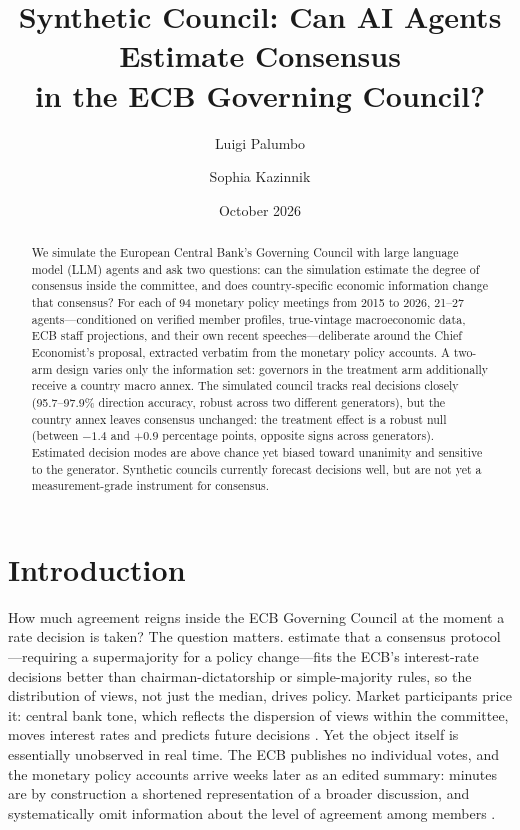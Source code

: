 \documentclass[11pt,a4paper]{article}
\title{\textbf{Synthetic Council: Can AI Agents Estimate Consensus\\ in the ECB Governing Council?}}
\author{Luigi Palumbo \and Sophia Kazinnik}
\date{October 2026}
\begin{document}
\maketitle

\begin{abstract}
\noindent
We simulate the European Central Bank's Governing Council with large language model (LLM) agents and ask two questions: can the simulation estimate the degree of consensus inside the committee, and does country-specific economic information change that consensus? For each of 94 monetary policy meetings from 2015 to 2026, 21--27 agents---conditioned on verified member profiles, true-vintage macroeconomic data, ECB staff projections, and their own recent speeches---deliberate around the Chief Economist's proposal, extracted verbatim from the monetary policy accounts. A two-arm design varies only the information set: governors in the treatment arm additionally receive a country macro annex. The simulated council tracks real decisions closely (95.7--97.9\% direction accuracy, robust across two different generators), but the country annex leaves consensus unchanged: the treatment effect is a robust null (between $-1.4$ and $+0.9$ percentage points, opposite signs across generators). Estimated decision modes are above chance yet biased toward unanimity and sensitive to the generator. Synthetic councils currently forecast decisions well, but are not yet a measurement-grade instrument for consensus.
\end{abstract}

\section{Introduction}\label{sec:intro}

How much agreement reigns inside the ECB Governing Council at the moment a rate decision is taken? The question matters. \textcite{riboni2010committee} estimate that a consensus protocol---requiring a supermajority for a policy change---fits the ECB's interest-rate decisions better than chairman-dictatorship or simple-majority rules, so the distribution of views, not just the median, drives policy. Market participants price it: central bank tone, which reflects the dispersion of views within the committee, moves interest rates and predicts future decisions \parencite{hubert2019tone}. Yet the object itself is essentially unobserved in real time. The ECB publishes no individual votes, and the monetary policy accounts arrive weeks later as an edited summary: minutes are by construction a shortened representation of a broader discussion, and systematically omit information about the level of agreement among members \parencite{apel2021disclose}.
\end{document}
